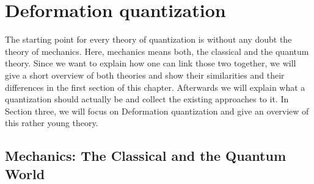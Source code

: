 
%
%

\chapter{Deformation quantization}

The starting point for every theory of quantization is without any doubt the 
theory of mechanics. Here, mechanics means both, the classical and the quantum 
theory. Since we want to explain how one can link those two together, we will give 
a short overview of both theories and show their similarities and their 
differences in the first section of this chapter. Afterwards we will explain what 
a quantization should actually be and collect the existing approaches to it. In 
Section three, we will focus on Deformation quantization and give an overview of 
this rather young theory.



\section{Mechanics: The Classical and the Quantum World}
\label{sec:chap2_Mechanics}

